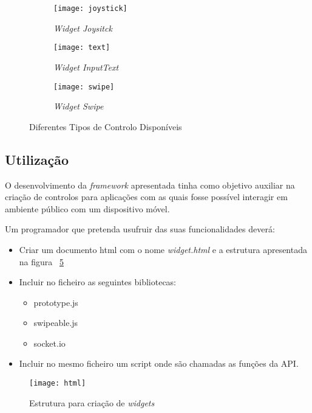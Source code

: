 	\begin{figure}[ht]
	  \centering
	  \leavevmode
	  \begin{subfigure}{.33\textwidth}
	    \centering
	    \texttt{[image: joystick]}
	    \caption{\textit{Widget Joysitck}}
	    \label{fig:joystick}
	  \end{subfigure}%
	  \begin{subfigure}{.33\textwidth}
	    \centering
	    \texttt{[image: text]}
	    \caption{\textit{Widget InputText}}
	    \label{fig:inputext}
	  \end{subfigure}%
	   \begin{subfigure}{.33\textwidth}
	    \centering
	    \texttt{[image: swipe]}
	    \caption{\textit{Widget Swipe}}
	    \label{fig:swipe}
	  \end{subfigure}
	  \caption{Diferentes Tipos de Controlo Disponíveis}
	  \label{fig:widgets}
	\end{figure}

\subsection{Utilização}

	O desenvolvimento da \textit{framework} apresentada tinha como objetivo auxiliar na criação de controlos para aplicações com as quais fosse possível interagir em ambiente público com um dispositivo móvel.

	Um programador que pretenda usufruir das suas funcionalidades deverá:

	\begin{itemize}
		\item Criar um documento html com o nome \textit{widget.html} e a estrutura apresentada na figura ~\ref{fig:html_struct}
		\item Incluir no ficheiro as seguintes bibliotecas:
			\begin{itemize}
			\item prototype.js 
			\item swipeable.js
			\item socket.io
			\end{itemize}
		\item Incluir no mesmo ficheiro um script onde são chamadas as funções da API.
	\end{itemize}

	\begin{figure}[ht]
		\centering
		\texttt{[image: html]}
		\caption[Estrutura html] {Estrutura para criação de \textit{widgets}}
		\label{fig:html_struct}
	\end{figure}

